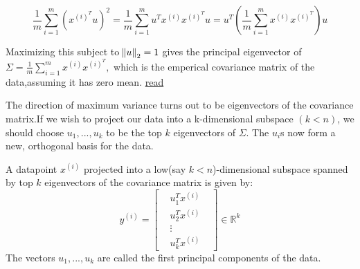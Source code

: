 \documentclass[12pt]{article}
\begin{document}
 $$\frac{1}{m} \sum_{i=1}^{m}(x^{(i)^T}u)^{2} = \frac{1}{m} \sum_{i=1}^{m} u^{T}x^{(i)}x^{(i)^T}u = u^{T} \left(\frac{1}{m} \sum_{i=1}^{m} x^{(i)}x^{(i)^T} \right)u$$
 
 Maximizing this subject to  $\norm{u}_{2}=1$ gives the principal eigenvector of $\Sigma = \frac{1}{m} \sum_{i=1}^{m} x^{(i)}x^{(i)^T} ,$ which is the emperical covariance matrix of the data,assuming it has zero mean. \href{https://math.stackexchange.com/questions/1199852/maximize-the-value-of-vtav}{read}
 
 The direction of maximum variance turns out to be eigenvectors of the covariance matrix.If we wish to project our data into a k-dimensional subspace $(k < n)$, we should choose $u_{1}, ..., u_{k}$ to be the top $k$ eigenvectors of $\Sigma$. The $u_{i}$s now form a new, orthogonal basis for the data.
 
 A datapoint $x^{(i)}$ projected into a low(say $k<n$)-dimensional subspace  spanned by top $k$ eigenvectors of the covariance matrix is given by:
 $$y^{(i)} =\begin{bmatrix} 
 	& u_{1}^{T}x^{(i)} &  \\
 	& u_{2}^{T}x^{(i)} &\\
 	& \vdots & \\
 	& u_{k}^{T}x^{(i)} &
 \end{bmatrix}  \in \mathbb{R}^{k}$$
 The vectors  $u_{1}, ..., u_{k}$ are called the first principal components of the data.
 
 
 
 
 
 
 
 
 
 
 
 
 
 
  
 
\end{document}
